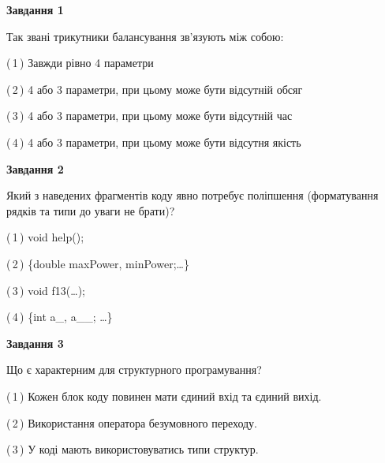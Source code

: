 \documentclass[10pt, ukrainian]{article}
\begin{document}
{
\begin {large}
{\begin {center}\textbf{Завдання 1}\end {center}}\par
Так звані трикутники балансування зв'язують між собою:\par
\vspace{2mm}



(\,1\,) Завжди рівно 4 параметри%



(\,2\,) 4 або 3 параметри, при цьому може бути відсутній обсяг %



(\,3\,) 4 або 3 параметри, при цьому може бути відсутній час%



(\,4\,) 4 або 3 параметри, при цьому може бути відсутня якість%


{\begin {center}\textbf{Завдання 2}\end {center}}\par
Який з наведених фрагментів коду явно потребує поліпшення (форматування рядків та типи до уваги не брати)?\par
\vspace{2mm}



(\,1\,) void help();%



(\,2\,) \{double maxPower, minPower;…\} %



(\,3\,) void f13(…);%



(\,4\,) \{int a\_, a\_\_; …\}%


{\begin {center}\textbf{Завдання 3}\end {center}}\par
Що є характерним для структурного програмування?\par
\vspace{2mm}



(\,1\,) Кожен блок коду повинен мати єдиний вхід та єдиний вихід.%



(\,2\,) Використання оператора безумовного переходу. %



(\,3\,) У коді мають використовуватись типи структур. %




\end{large}}
\end{document}
